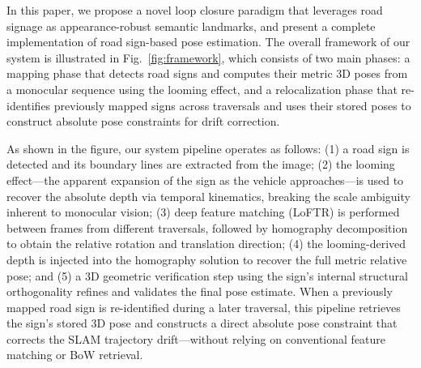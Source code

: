 \documentclass[runningheads]{llncs}
\begin{document}
In this paper, we propose a novel loop closure paradigm that leverages road signage as
appearance-robust semantic landmarks, and present a complete implementation of road sign-based
pose estimation. The overall framework of our system is illustrated in Fig.~\ref{fig:framework},
which consists of two main phases: a mapping phase that detects road signs and computes their
metric 3D poses from a monocular sequence using the looming effect, and a relocalization phase
that re-identifies previously mapped signs across traversals and uses their stored poses to
construct absolute pose constraints for drift correction.

As shown in the figure, our system pipeline operates as follows: (1) a road sign is detected and its
boundary lines are extracted from the image; (2) the looming effect---the apparent expansion of
the sign as the vehicle approaches---is used to recover the absolute depth via temporal kinematics,
breaking the scale ambiguity inherent to monocular vision; (3) deep feature matching (LoFTR) is
performed between frames from different traversals, followed by homography decomposition to
obtain the relative rotation and translation direction; (4) the looming-derived depth is injected
into the homography solution to recover the full metric relative pose; and (5) a 3D geometric
verification step using the sign's internal structural orthogonality refines and validates the final
pose estimate. When a previously mapped road sign is re-identified during a later traversal, this
pipeline retrieves the sign's stored 3D pose and constructs a direct absolute pose constraint that
corrects the SLAM trajectory drift---without relying on conventional feature matching or BoW
retrieval.
\end{document}
